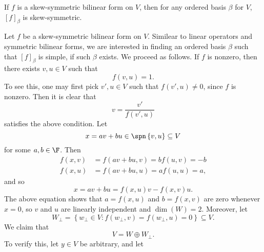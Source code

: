 \documentclass[linearalgebraII]{subfiles}
\begin{document}
    \begin{remark}
        If $f$ is a skew-symmetric bilinear form on $V$, then for any ordered basis $\beta$ for $V$, $\left[ f \right] _\beta$ is skew-symmetric.
    \end{remark}

    \begin{remark}
        Let $f$ be a skew-symmetric bilinear form on $V$. Similear to linear operators and symmetric bilinear forms, we are interested in finding an ordered basis $\beta$ such that $\left[ f \right] _\beta$ is simple, if such $\beta$ exists. We proceed as follows. If $f$ is nonzero, then there exists $v, u\in V$ such that
        \begin{equation*}
            f(v,u) = 1.
        \end{equation*}
        To see this, one may first pick $v',u\in V$ such that $f\left( v',u \right)\neq 0$, since $f$ is nonzero. Then it is clear that
        \begin{equation*}
            v = \frac{v'}{f\left( v',u \right) } 
        \end{equation*}
        satisfies the above condition. Let
        \begin{equation*}
            x = av + bu\in \spn\left\lbrace v,u \right\rbrace \subseteq V
        \end{equation*}
        for some $a,b\in\F$. Then
        \begin{align*}
            f\left( x,v \right) & = f\left( av+bu, v \right) = bf(u,v) = -b \\
            f\left( x,u \right) & = f\left( av+bu, u \right) = af(u,u) = a,
        \end{align*} 
        and so
        \begin{equation*}
            x = av+bu = f\left( x,u \right) v - f\left( x,v \right) u.
        \end{equation*}
        The above equation shows that $a=f(x,u)$ and $b=f(x,v)$ are zero whenever $x=0$, so $v$ and $u$ are linearly independent and $\dim(W)=2$. Moreover, let
        \begin{equation*}
            W_\perp = \left\lbrace w_\perp\in V: f\left( w_\perp,v \right) = f\left( w_\perp, u \right) = 0 \right\rbrace \subseteq V.
        \end{equation*}
        We claim that
        \begin{equation*}
            V = W\oplus W_\perp.
        \end{equation*}
        To verify this, let $y\in V$ be arbitrary, and let

\end{remark}
\end{document}
